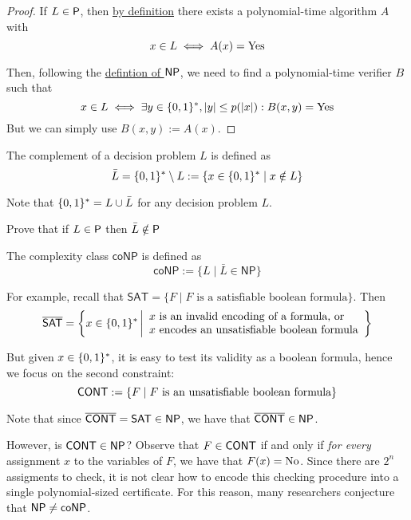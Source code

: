 \begin{proof}
	If $L\in\P$, then \hyperref[ee3be28]{by definition} there exists a polynomial-time algorithm $A$ with
	$$x\in L\iff A(x)=\Yes$$

	Then, following the \hyperref[d93050e]{defintion of $\NP$}, we need
	to find a polynomial-time verifier $B$ such that
	$$
		x\in L\iff\exists y\in\binrep,|y|\leq p(|x|):B(x,y)=\Yes
	$$
	But we can simply use $B(x,y):=A(x)$.
\end{proof}


The complement of a decision problem $L$ is defined as
$$
	\bar L=\binrep\setminus L:=\{x\in\binrep\mid x\notin L\}
$$

Note that $\binrep=L\cup\bar L$ for any decision problem $L$.

 Prove that if $L\in\P$ then $\bar L\notin\P$



The complexity class $\mathsf{coNP}$ is defined as
$$
	\mathsf{coNP}:=\{L\mid\bar L\in\mathsf{NP}\}
$$

For example, recall that $\mathsf{\hyperref[d6893fe]{SAT}}=\{F\mid
	F\text{ is a satisfiable boolean formula}\}$. Then
$$
	\overline{\SAT}=\left\{x\in\binrep\, \middle\vert
	\begin{array}{l}
		\text{$x$ is an invalid encoding of a formula, or} \\
		\text{$x$ encodes an unsatisfiable boolean formula}
	\end{array}
	\right\}
$$

But given $x\in\binrep$, it is easy to test its validity as a boolean
formula, hence we focus on the second constraint:
$$
	\CONT:=\{F\mid F\text{ is an unsatisfiable boolean formula}\}
$$

Note that since $\overline{\CONT}=\SAT\in\NP$, we have that
$\overline{\CONT}\in\NP$.

However, is $\CONT\in\NP$? Observe that $F\in\CONT$ if and only if
\textit{for every} assignment $x$ to the variables of $F$, we have
that $F(x)=\No$. Since there are $2^n$ assigments to check, it is not
clear how to encode this checking procedure into a single
polynomial-sized certificate. For this reason, many researchers
conjecture that $\NP\neq\coNP$.
